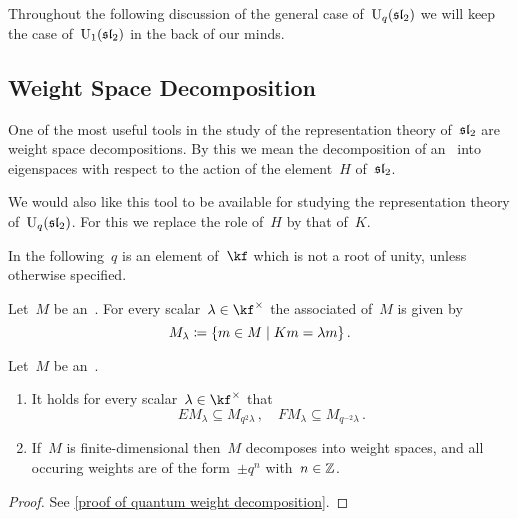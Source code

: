 \documentclass[a4paper, 11pt, oneside]{scrartcl}
\begin{document}
Throughout the following discussion of the general case of~$\operatorname{U}_q(\mathfrak{sl}_2)$ we will keep the case of~$\operatorname{U}_1(\mathfrak{sl}_2)$ in the back of our minds.



\subsection{Weight Space Decomposition}

One of the most useful tools in the study of the representation theory of~$\mathfrak{sl}_2$ are weight space decompositions.
By this we mean the decomposition of an~ into eigenspaces with respect to the action of the element~$H$ of~$\mathfrak{sl}_2$.

We would also like this tool to be available for studying the representation theory of~$\operatorname{U}_q(\mathfrak{sl}_2)$.
For this we replace the role of~$H$ by that of~$K$.

\begin{convention}
  In the following~$q$ is an element of~$\kf$ which is not a root of unity, unless otherwise specified.
\end{convention}

\begin{definition}
  Let~$M$ be an~.
  For every scalar~$\lambda \in \kf^{\times}$ the associated  of~$M$ is given by
  \[
    M_\lambda
    \defined
    \{
      m \in M
    \suchthat
      K m = \lambda m
    \} \,.
  \]
\end{definition}

\begin{theorem}
  \label{quantum weight decomposition}
  Let~$M$ be an~.
  \begin{enumerate}
    \item
      It holds for every scalar~$\lambda \in \kf^{\times}$ that
      \[
        E M_\lambda \subseteq M_{q^2 \lambda} \,,
        \quad
        F M_\lambda \subseteq M_{q^{-2} \lambda} \,.
      \]
    \item
      If~$M$ is finite-dimensional then~$M$ decomposes into weight spaces, and all occuring weights are of the form~$\pm q^n$ with~$n \in \mathbb{Z}$.
  \end{enumerate}
\end{theorem}

\begin{proof}
  See \cref{proof of quantum weight decomposition}.
\end{proof}
\end{document}
